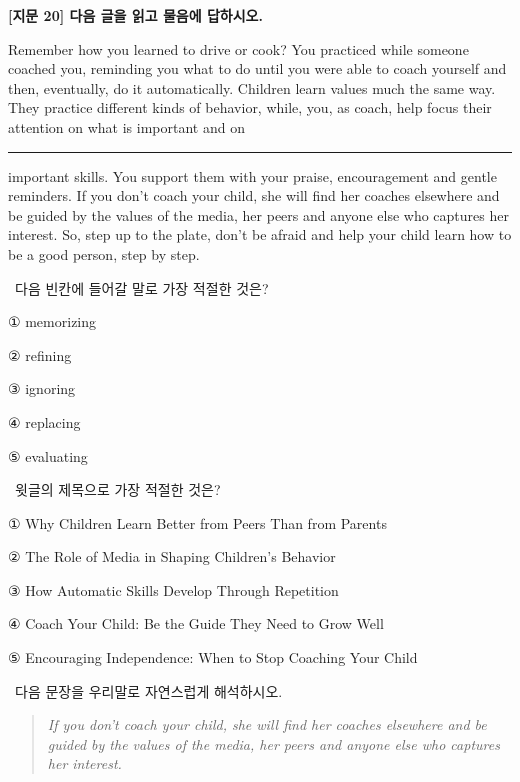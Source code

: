 \documentclass[11pt,a4paper]{article}
\newcommand{\qno}[1]{\par\vspace{8pt}\noindent{\sffamily\bfseries #1.}\ }
\newcommand{\instr}[1]{{\sffamily #1}\par\vspace{3pt}}
\begin{document}
\begin{center}
{\fontsize{15}{17}\selectfont\sffamily\bfseries [지문 20] 다음 글을 읽고 물음에 답하시오.}
\end{center}
\vspace{4pt}

\begin{pbox}
Remember how you learned to drive or cook? You practiced while someone coached you,
reminding you what to do until you were able to coach yourself and then, eventually, do it
automatically. Children learn values much the same way. They practice different kinds of
behavior, while, you, as coach, help focus their attention on what is important and on
\rule{3cm}{0.4pt} important skills. You support them with your praise, encouragement and
gentle reminders. If you don't coach your child, she will find her coaches elsewhere and be
guided by the values of the media, her peers and anyone else who captures her interest.
So, step up to the plate, don't be afraid and help your child learn how to be a good person,
step by step.
\end{pbox}

\qno{1}\instr{다음 빈칸에 들어갈 말로 가장 적절한 것은?}
\begin{choices}
\item ① memorizing
\item ② refining
\item ③ ignoring
\item ④ replacing
\item ⑤ evaluating
\end{choices}

\qno{2}\instr{윗글의 제목으로 가장 적절한 것은?}
\begin{choices}
\item ① Why Children Learn Better from Peers Than from Parents
\item ② The Role of Media in Shaping Children's Behavior
\item ③ How Automatic Skills Develop Through Repetition
\item ④ Coach Your Child: Be the Guide They Need to Grow Well
\item ⑤ Encouraging Independence: When to Stop Coaching Your Child
\end{choices}

\qno{3}\instr{[서술형] 다음 문장을 우리말로 자연스럽게 해석하시오.}

\begin{quote}
\itshape
If you don't coach your child, she will find her coaches elsewhere and be guided by the
values of the media, her peers and anyone else who captures her interest.
\end{quote}
\end{document}
